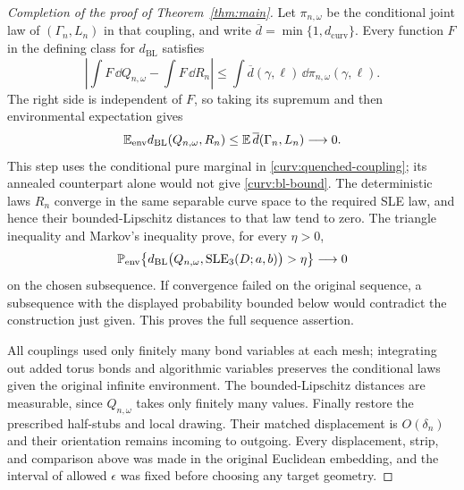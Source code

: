 \begin{proof}[Completion of the proof of Theorem~\ref{thm:main}]
Let $\pi_{n,\omega}$ be the conditional joint law of
$(\Gamma_n,L_n)$ in that coupling, and write
$\overline d=\min\{1,d_{\mathrm{curv}}\}$.  Every function $F$ in the defining
class for $d_{\mathrm{BL}}$ satisfies
\[
 \left|\int F\,\dd Q_{n,\omega}-\int F\,\dd R_n\right|
 \le\int \overline d(\gamma,\ell)\,
                    \dd\pi_{n,\omega}(\gamma,\ell).
\]
The right side is independent of $F$, so taking its supremum and then
environmental expectation gives
\begin{equation}
 \mathbb E_{\mathrm{env}}d_{\mathrm{BL}}(Q_{n,\omega},R_n)
 \le \mathbb E\,\overline d(\Gamma_n,L_n)\longrightarrow0.
 \label{curv:bl-bound}
\end{equation}
This step uses the conditional pure marginal in
\eqref{curv:quenched-coupling}; its annealed counterpart alone would
not give \eqref{curv:bl-bound}.  The deterministic laws $R_n$ converge
in the same separable curve space to the required SLE law, and hence
their bounded-Lipschitz distances to that law tend to zero.  The
triangle inequality and Markov's inequality prove, for every $\eta>0$,
\[
 \mathbb P_{\mathrm{env}}\!\left\{
 d_{\mathrm{BL}}\bigl(Q_{n,\omega},\mathrm{SLE}_3(D;a,b)\bigr)
       >\eta\right\}\longrightarrow0
\]
on the chosen subsequence.  If convergence failed on the original
sequence, a subsequence with the displayed probability bounded below
would contradict the construction just given.  This proves the full
sequence assertion.

All couplings used only finitely many bond variables at each mesh;
integrating out added torus bonds and algorithmic variables preserves
the conditional laws given the original infinite environment.  The
bounded-Lipschitz distances are measurable, since $Q_{n,\omega}$ takes
only finitely many values.  Finally restore the prescribed half-stubs
and local drawing.  Their matched displacement is $O(\delta_n)$ and
their orientation remains incoming to outgoing.  Every displacement,
strip, and comparison above was made in the original Euclidean
embedding, and the interval of allowed $\epsilon$ was fixed before
choosing any target geometry.
\end{proof}
